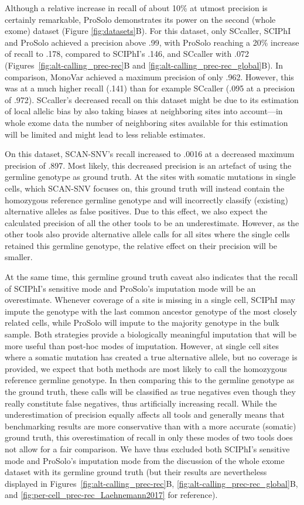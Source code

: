 \documentclass[12pt,inline]{wlscirep}
\begin{document}
Although a relative increase in recall of about 10\% at utmost precision is certainly remarkable, ProSolo demonstrates its power on the second (whole exome) dataset (Figure \ref{fig:datasets}B).
For this dataset, only SCcaller, SCIPhI and ProSolo achieved a precision above .99, with ProSolo reaching a 20\% increase of recall to .178, compared to SCIPhI's .146, and SCcaller with .072 (Figures~\ref{fig:alt-calling_prec-rec}B and \ref{fig:alt-calling_prec-rec_global}B).
In comparison, MonoVar achieved a maximum precision of only .962. However, this was at a much higher recall (.141) than for example SCcaller (.095 at a precision of .972).
SCcaller's decreased recall on this dataset might be due to its estimation of local allelic bias by also taking biases at neighboring sites into account---in whole exome data the number of neighboring sites available for this estimation will be limited and might lead to less reliable estimates.

On this dataset, SCAN-SNV's recall increased to .0016 at a decreased maximum precision of .897.
Most likely, this decreased precision is an artefact of using the germline genotype as ground truth.
At the sites with somatic mutations in single cells, which SCAN-SNV focuses on, this ground truth will instead contain the homozygous reference germline genotype and will incorrectly classify (existing) alternative alleles as false positives.
Due to this effect, we also expect the calculated precision of all the other tools to be an underestimate.
However, as the other tools also provide alternative allele calls for all sites where the single cells retained this germline genotype, the relative effect on their precision will be smaller.

At the same time, this germline ground truth caveat also indicates that the recall of SCIPhI's sensitive mode and ProSolo's imputation mode will be an overestimate.
Whenever coverage of a site is missing in a single cell, SCIPhI may impute the genotype with the last common ancestor genotype of the most closely related cells, while ProSolo will impute to the majority genotype in the bulk sample.
Both strategies provide a biologically meaningful imputation that will be more useful than post-hoc modes of imputation.
However, at single cell sites where a somatic mutation has created a true alternative allele, but no coverage is provided, we expect that both methods are most likely to call the homozygous reference germline genotype.
In then comparing this to the germline genotype as the ground truth, these calls will be classified as true negatives even though they really constitute false negatives, thus artificially increasing recall.
While the underestimation of precision equally affects all tools and generally means that benchmarking results are more conservative than with a more accurate (somatic) ground truth, this overestimation of recall in only these modes of two tools does not allow for a fair comparison.
We have thus excluded both SCIPhI's sensitive mode and ProSolo's imputation mode from the discussion of the whole exome dataset with its germline ground truth (but their results are nevertheless displayed in Figures~\ref{fig:alt-calling_prec-rec}B, \ref{fig:alt-calling_prec-rec_global}B, and \ref{fig:per-cell_prec-rec_Laehnemann2017} for reference).
\end{document}
